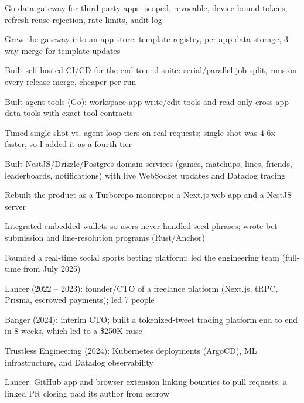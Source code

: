 \documentclass[print]{jack-resume}
\begin{document}
\begin{tightemize}
    \item Go data gateway for third-party apps: scoped, revocable, device-bound tokens, refresh-reuse rejection, rate limits, audit log
    \item Grew the gateway into an app store: template registry, per-app data storage, 3-way merge for template updates
    \item Built self-hosted CI/CD for the end-to-end suite: serial/parallel job split, runs on every release merge, cheaper per run
    \item Built agent tools (Go): workspace app write/edit tools and read-only cross-app data tools with exact tool contracts
    \item Timed single-shot vs. agent-loop tiers on real requests; single-shot was 4-6x faster, so I added it as a fourth tier
\end{tightemize}
\sectionsep

\begin{tightemize}
    \item Built NestJS/Drizzle/Postgres domain services (games, matchups, lines, friends, leaderboards, notifications) with live WebSocket updates and Datadog tracing
    \item Rebuilt the product as a Turborepo monorepo: a Next.js web app and a NestJS server
    \item Integrated embedded wallets so users never handled seed phrases; wrote bet-submission and line-resolution programs (Rust/Anchor)
    \item Founded a real-time social sports betting platform; led the engineering team (full-time from July 2025)
\end{tightemize}
\sectionsep

\begin{tightemize}
    \item Lancer (2022 -- 2023): founder/CTO of a freelance platform (Next.js, tRPC, Prisma, escrowed payments); led 7 people
    \item Banger (2024): interim CTO; built a tokenized-tweet trading platform end to end in 8 weeks, which led to a \$250K raise
    \item Trustless Engineering (2024): Kubernetes deployments (ArgoCD), ML infrastructure, and Datadog observability
    \item Lancer: GitHub app and browser extension linking bounties to pull requests; a linked PR closing paid its author from escrow
\end{tightemize}
\sectionsep
\end{document}
